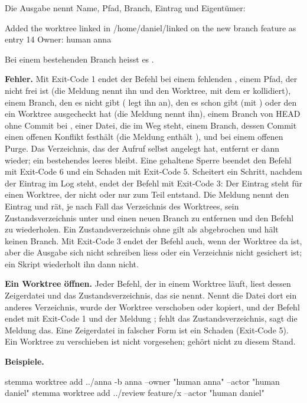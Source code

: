 Die Ausgabe nennt Name, Pfad, Branch, Eintrag und Eigentümer:

\starttyping
Added the worktree linked in /home/daniel/linked on the new branch feature as entry 14
Owner: human anna
\stoptyping

Bei einem bestehenden Branch heisst es .

{\bf Fehler.} Mit Exit-Code 1 endet der Befehl bei einem fehlenden , einem Pfad, der
nicht frei ist (die Meldung nennt ihn und den Worktree, mit dem er kollidiert), einem Branch, den
es nicht gibt ( legt ihn an), den es schon gibt (mit ) oder den ein Worktree
ausgecheckt hat (die Meldung nennt ihn), einem Branch von HEAD ohne Commit bei ,
einer Datei, die im Weg steht, einem Branch, dessen Commit einen offenen Konflikt festhält
(die Meldung enthält ), und bei einem offenen Purge. Das Verzeichnis, das der Aufruf selbst
angelegt hat, entfernt er dann wieder; ein bestehendes leeres bleibt. Eine gehaltene Sperre
beendet den Befehl mit Exit-Code 6 und ein Schaden mit Exit-Code 5.
Scheitert ein Schritt, nachdem der Eintrag im Log steht, endet der Befehl mit Exit-Code 3: Der
Eintrag steht für einen Worktree, der nicht oder nur zum Teil entstand. Die Meldung nennt den
Eintrag und rät, je nach Fall das Verzeichnis des Worktrees, sein Zustandsverzeichnis unter
 und einen neuen Branch zu entfernen und den Befehl zu wiederholen.
Ein Zustandsverzeichnis ohne  gilt als abgebrochen und hält keinen Branch.
Mit Exit-Code 3 endet der Befehl auch, wenn der Worktree da ist, aber die Ausgabe sich nicht
schreiben liess oder ein Verzeichnis nicht gesichert ist; ein Skript wiederholt ihn dann nicht.

{\bf Ein Worktree öffnen.} Jeder Befehl, der in einem Worktree läuft, liest dessen Zeigerdatei und
das Zustandsverzeichnis, das sie nennt. Nennt die Datei  dort ein anderes
Verzeichnis, wurde der Worktree verschoben oder kopiert, und der Befehl endet mit Exit-Code 1 und
der Meldung ; fehlt das Zustandsverzeichnis, sagt die
Meldung das. Eine Zeigerdatei in falscher Form ist ein Schaden (Exit-Code 5). Ein Worktree zu
verschieben ist nicht vorgesehen;  gehört nicht zu diesem Stand.

{\bf Beispiele.}

\starttyping
stemma worktree add ../anna -b anna --owner "human anna" --actor "human daniel"
stemma worktree add ../review feature/x --actor "human daniel"
\stoptyping

